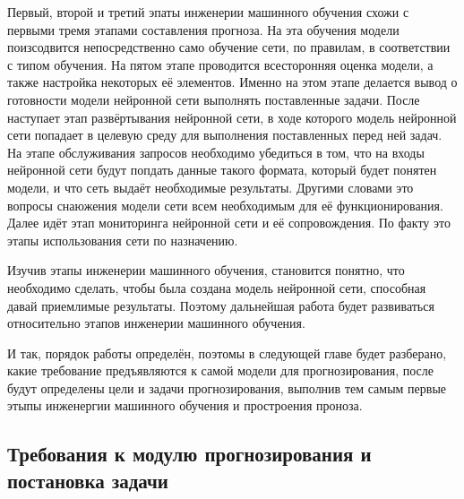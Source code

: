 {  \par \redline Первый, второй и третий эпаты инженерии машинного обучения схожи с первыми тремя этапами составления прогноза. На эта обучения модели поизсодвится непосредственно само обучение сети, по правилам, в соответствии с типом обучения. На пятом этапе проводится всесторонняя оценка модели, а также настройка некоторых её элементов. Именно на этом этапе делается вывод о готовности модели нейронной сети выполнять поставленные задачи. После наступает этап развёртывания нейронной сети, в ходе которого модель нейронной сети попадает в целевую среду для выполнения поставленных перед ней задач. На этапе обслуживания запросов необходимо убедиться в том, что на входы нейронной сети будут попдать данные такого формата, который будет понятен модели, и что сеть выдаёт необходимые результаты. Другими словами это вопросы снаюжения модели сети всем необходимым для её функционирования. Далее идёт этап мониторинга нейронной сети и её сопровождения. По факту это этапы использования сети по назначению.    

  \par \redline Изучив этапы инженерии машинного обучения, становится понятно, что необходимо сделать, чтобы была создана модель нейронной сети, способная давай приемлимые результаты. Поэтому дальнейшая работа будет развиваться относительно этапов инженерии машинного обучения.

  \par \redline И так, порядок работы определён, поэтомы в следующей главе будет разберано, какие требование предъявляются к самой модели для прогнозирования, после будут определены цели и задачи прогнозирования, выполнив тем самым первые этыпы инженергии машинного обучения и простроения проноза.

  \par
}

\subtitlespace

\subsection*{
  \gostTitleFont
   Требования к модулю прогнозирования и постановка задачи
} 

\subtitlespace

